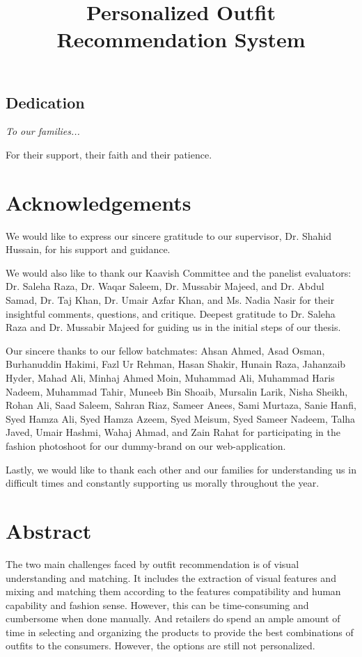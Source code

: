 \documentclass[12pt]{report}
\title{Personalized Outfit Recommendation System}
\begin{document}


\begin{center}
\chapter*{Dedication}
 \textit{To our families...}

For their support, their faith and their patience.
\end{center}

\chapter*{Acknowledgements}
We would like to express our sincere gratitude to our supervisor, Dr. Shahid Hussain, for his support and guidance.\newline 

We would also like to thank our Kaavish Committee and the panelist evaluators: Dr. Saleha Raza, Dr. Waqar Saleem, Dr. Mussabir Majeed, and Dr. Abdul Samad, Dr. Taj Khan, Dr. Umair Azfar Khan, and Ms. Nadia Nasir for their insightful comments, questions, and critique. Deepest gratitude to Dr. Saleha Raza and Dr. Mussabir Majeed for guiding us in the initial steps of our thesis. \newline

Our sincere thanks to our fellow batchmates: Ahsan Ahmed, Asad Osman, Burhanuddin Hakimi, Fazl  Ur Rehman, Hasan Shakir, Hunain Raza,  Jahanzaib Hyder, Mahad Ali, Minhaj Ahmed Moin,  Muhammad Ali, Muhammad Haris Nadeem, Muhammad Tahir, Muneeb Bin Shoaib, Mursalin Larik,  Nisha Sheikh, Rohan Ali, Saad Saleem, Sahran Riaz, Sameer Anees, Sami Murtaza, Sanie Hanfi, Syed Hamza Ali, Syed Hamza Azeem, Syed Meisum, Syed Sameer Nadeem, Talha Javed, Umair Hashmi, Wahaj Ahmad, and Zain Rahat for participating in the fashion photoshoot for our dummy-brand on our web-application.\newline

Lastly, we would like to thank each other and our families for understanding us in difficult times and constantly supporting us morally throughout the year.

\chapter*{Abstract}
The two main challenges faced by outfit recommendation is of visual understanding and matching. It includes the extraction of visual features and mixing and matching them according to the features compatibility and human capability and fashion sense. However, this can be time-consuming and cumbersome when done manually. And retailers do spend an ample amount of time in selecting and organizing the products to provide the best combinations of outfits to the consumers. However, the options are still not personalized. \newline
\end{document}
